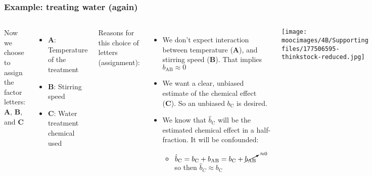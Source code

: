 \documentclass[handout,11pt,aspectratio=169,mathserif]{beamer}
\begin{document}
\begin{frame}\frametitle{Example: treating water (again)}
	
	\begin{columns}[T]
			Now we choose to assign the factor letters: \textbf{A}, \textbf{B}, and \textbf{C}
			
			\vspace{0.25cm}
			\begin{itemize} 
				\item	\textbf{A}: Temperature of the treatment
				\item	\textbf{B}: Stirring speed				
				\item	\textbf{C}: Water treatment chemical used

			\end{itemize}
			
			\vspace{0.5cm}
			Reasons for this choice of letters (assignment):
			\begin{itemize}
				\item	We don't expect interaction between temperature (\textbf{A}), and stirring speed (\textbf{B}). That implies $b_\text{AB} \approx 0$
				\item	We want a clear, unbiased estimate of the chemical effect (\textbf{C}). So an unbiased $b_\text{C}$ is desired.
				\item	We know that $\hat{b}_\text{C}$ will be the estimated chemical effect in a half-fraction. It will
					 	be confounded:
				\begin{itemize}
					\item	$\hat{b}_\text{C}  = b_\text{C} + b_\text{AB}  = b_\text{C} + \cancelto{\approx 0}{b_\text{AB}} \qquad$ so then $\hat{b}_C \approx b_\text{C}$
				\end{itemize}
			\end{itemize}
		
			\texttt{[image: \\moocimages/4B/Supporting files/177506595-thinkstock-reduced.jpg]}
	\end{columns}
\end{frame}
\end{document}
